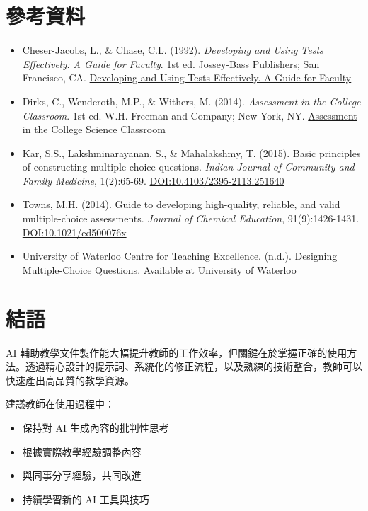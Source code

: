 \documentclass[12pt,a4paper]{article}
\begin{document}
\section{參考資料}
\begin{itemize}
    \item Cheser-Jacobs, L., \& Chase, C.L. (1992). \textit{Developing and Using Tests Effectively: A Guide for Faculty}. 1st ed. Jossey-Bass Publishers; San Francisco, CA. \href{https://eric.ed.gov/?id=ED351948}{Developing and Using Tests Effectively. A Guide for Faculty}
    \item Dirks, C., Wenderoth, M.P., \& Withers, M. (2014). \textit{Assessment in the College Classroom}. 1st ed. W.H. Freeman and Company; New York, NY. \href{https://www.books.com.tw/products/F013353822?loc=M_0005_002&srsltid=AfmBOoq6NkUq70He3PkzFfURGA8XTWOpK-GnO9Lnjru3e7wZgJJfRXQN}{Assessment in the College Science Classroom}
    \item Kar, S.S., Lakshminarayanan, S., \& Mahalakshmy, T. (2015). Basic principles of constructing multiple choice questions. \textit{Indian Journal of Community and Family Medicine}, 1(2):65-69. \href{https://journals.lww.com/ijcf/abstract/2015/01020/basic_principles_of_constructing_multiple_choice.15.aspx}{DOI:10.4103/2395-2113.251640}
    \item Towns, M.H. (2014). Guide to developing high-quality, reliable, and valid multiple-choice assessments. \textit{Journal of Chemical Education}, 91(9):1426-1431. \href{https://pubs.acs.org/doi/10.1021/ed500076x}{DOI:10.1021/ed500076x}
    \item University of Waterloo Centre for Teaching Excellence. (n.d.). Designing Multiple-Choice Questions. \href{https://uwaterloo.ca/centre-for-teaching-excellence/catalogs/tip-sheets/designing-multiple-choice-questions}{Available at University of Waterloo}
\end{itemize}

\section{結語}

AI 輔助教學文件製作能大幅提升教師的工作效率，但關鍵在於掌握正確的使用方法。透過精心設計的提示詞、系統化的修正流程，以及熟練的技術整合，教師可以快速產出高品質的教學資源。

建議教師在使用過程中：
\begin{itemize}
    \item 保持對 AI 生成內容的批判性思考
    \item 根據實際教學經驗調整內容
    \item 與同事分享經驗，共同改進
    \item 持續學習新的 AI 工具與技巧
\end{itemize}
\end{document}
